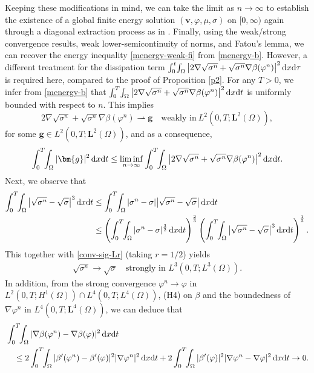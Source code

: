 \documentclass[11pt,reqno]{amsart}
\def\d{{\rm d}}
\def\vv{\bm{v}}
\begin{document}
Keeping these modifications in mind, we can take the limit as $n\to \infty$ to establish the existence of a global finite energy solution $(\vv,\varphi, \mu, \sigma)$ on $[0,\infty)$ again through a diagonal extraction process as in \cite{Bo13}. Finally, using the weak/strong convergence results, weak lower-semicontinuity of norms, and Fatou's lemma, we can recover the energy inequality \eqref{menergy-weak-fi} from \eqref{menergy-b}.
However, a different treatment for the dissipation term $\int_0^t\!\int_\Omega \big| 2\nabla \sqrt{\sigma^n} + \sqrt{\sigma^n} \nabla \beta(\varphi^n) \big|^2 \,\d x\d \tau$ is required here, compared to the proof of Proposition \ref{p2}.
For any $T>0$, we infer from \eqref{menergy-b} that $\int_0^T\!\int_\Omega \big| 2\nabla \sqrt{\sigma^n} + \sqrt{\sigma^n} \nabla \beta(\varphi^n) \big|^2 \,\d x\d t$ is uniformly bounded with respect to $n$. This implies
$$
2\nabla \sqrt{\sigma^n} + \sqrt{\sigma^n} \nabla \beta(\varphi^n) \rightharpoonup \bm{g}
\quad \text{weakly in}\ L^2(0,T;\bm{L}^2(\Omega)),
$$
for some $\bm{g}\in L^2(0,T;\bm{L}^2(\Omega))$, and as a consequence,
%
\begin{align}
\int_0^T\!\!\int_\Omega |\bm{g}|^2\,\d x\d t\leq
\liminf_{n\to \infty} \int_0^T \!\!\int_\Omega \big| 2\nabla \sqrt{\sigma^n} + \sqrt{\sigma^n} \nabla \beta(\varphi^n) \big|^2 \,\d x\d t.
\label{inf-sigma-n}
\end{align}
%
Next, we observe that
%
\begin{align*}
\int_0^T\!\!\int_\Omega \big|\sqrt{\sigma^n}-\sqrt{\sigma}\big|^3\,\d x\d t &\leq \int_0^T\!\!\int_\Omega |\sigma^n- \sigma |\big|\sqrt{\sigma^n}-\sqrt{\sigma}\big| \,\d x\d t
\\
&\leq \left(\int_0^T\!\!\int_\Omega |\sigma^n- \sigma |^\frac32\,\d x\d t\right)^\frac23\left(\int_0^T\!\!\int_\Omega \big|\sqrt{\sigma^n}-\sqrt{\sigma}\big|^3\,\d x\d t\right)^\frac13.
\end{align*}
%
This together with \eqref{conv-sig-Lr} (taking $r=1/2$) yields
%
\begin{align}
\sqrt{\sigma^n}\to \sqrt{\sigma}\quad \text{strongly in } L^3(0,T;L^3(\Omega)).
\label{conv-sig-sL3}
\end{align}
%
In addition, from the strong convergence $\varphi^n\to \varphi$ in $L^2(0,T;H^1(\Omega))\cap L^4(0,T;L^4(\Omega))$, (H4) on $\beta$ and the boundedness of $\nabla \varphi^n$ in $L^4(0,T;\bm{L}^4(\Omega))$, we can deduce that
%
\begin{align*}
&\int_0^T\!\!\int_\Omega |\nabla \beta(\varphi^n)-\nabla \beta(\varphi)|^2\,\d x\d t
\\
&\quad \leq 2\int_0^T\!\!\int_\Omega |\beta'(\varphi^n)-\beta'(\varphi)|^2|\nabla \varphi^n|^2\,\d x\d t
+ 2\int_0^T\!\!\int_\Omega |\beta'(\varphi)|^2|\nabla \varphi^n-\nabla \varphi|^2\,\d x\d t
\to 0.
\end{align*}
\end{document}
